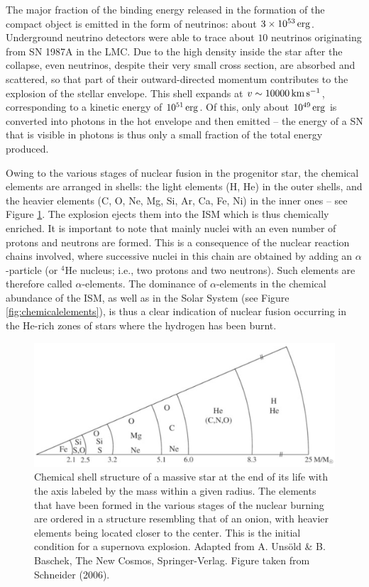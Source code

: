 \documentclass[a4paper,10pt]{article}
\begin{document}
{\noindent}The major fraction of the binding energy released in the formation of the compact object is emitted in the form of neutrinos: about $3\times10^{53}\,{\rm erg}$. Underground neutrino detectors were able to trace about $10$ neutrinos originating from SN 1987A in the LMC. Due to the high density inside the star after the collapse, even neutrinos, despite their very small cross section, are absorbed and scattered, so that part of their outward-directed momentum contributes to the explosion of the stellar envelope. This shell expands at $v\sim10000\,{\rm km\,s^{-1}}$, corresponding to a kinetic energy of $10^{51}\,{\rm erg}$. Of this, only about $10^{49}\,{\rm erg}$ is converted into photons in the hot envelope and then emitted -- the energy of a SN that is visible in photons is thus only a small fraction of the total energy produced.

{\noindent}Owing to the various stages of nuclear fusion in the progenitor star, the chemical elements are arranged in shells: the light elements (H, He) in the outer shells, and the heavier elements (C, O, Ne, Mg, Si, Ar, Ca, Fe, Ni) in the inner ones -- see Figure \ref{fig:chemicalstructure}. The explosion ejects them into the ISM which is thus chemically enriched. It is important to note that mainly nuclei with an even number of protons and neutrons are formed. This is a consequence of the nuclear reaction chains involved, where successive nuclei in this chain are obtained by adding an $\alpha$-particle (or $^4$He nucleus; i.e., two protons and two neutrons). Such elements are therefore called $\alpha$-elements. The dominance of $\alpha$-elements in the chemical abundance of the ISM, as well as in the Solar System (see Figure \ref{fig:chemicalelements}), is thus a clear indication of nuclear fusion occurring in the He-rich zones of stars where the hydrogen has been burnt.

\begin{figure}[h]
    \centering
    \includegraphics[width=12cm]{figures/ChemicalStructure.png}
    \caption{\footnotesize{Chemical shell structure of a massive star at the end of its life with the axis labeled by the mass within a given radius. The elements that have been formed in the various stages of the nuclear burning are ordered in a structure resembling that of an onion, with heavier elements being located closer to the center. This is the initial condition for a supernova explosion. Adapted from A. Uns\"{o}ld \& B. Baschek, The New Cosmos, Springer-Verlag. Figure taken from Schneider (2006).}}
    \label{fig:chemicalstructure}
\end{figure}
\end{document}
